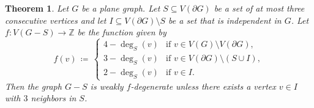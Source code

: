\documentclass[11pt]{article}
\theoremstyle{slantthm}
\newtheorem{thm}{Theorem}[section]
\numberwithin{equation}{section}
\theoremstyle{definition}
\newcommand{\defeq}{\coloneqq}
\numberwithin{equation}{section}
\newcommand{\Z}{\mathbb{Z}}
\newcommand{\0}{\varnothing}
\newcommand{\bdry}[1]{{\partial #1}}
\begin{document}
\begin{thm}\label{thm:inductive}
    Let $G$ be a plane graph. %
    Let $S \subseteq V(\bdry{G})$ be a set of at most three consecutive vertices %
    and let $I \subseteq V(\bdry{G}) \setminus S$ be a set that is independent in $G$. Let $f \colon V(G - S) \to \Z$ be the function given by %
     \begin{equation}\label{eq:f}
        f(v) \,\defeq\, \begin{cases}
            4 - \deg_S(v) &\text{if } v \in V(G) \setminus V(\bdry{G}),\\
            3 - \deg_S(v) &\text{if } v \in V(\bdry{G}) \setminus (S \cup I),\\
            2 - \deg_S(v) &\text{if } v \in I.%
        \end{cases}
    \end{equation}
    Then the graph $G - S$ is weakly $f$-degenerate unless there exists a vertex $v \in I$ with $3$ neighbors in $S$. %
\end{thm}
\end{document}
